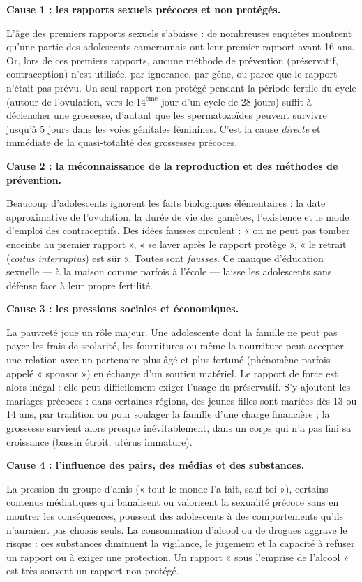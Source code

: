 \documentclass[11pt]{article}
\newcommand{\cle}[1]{{\popxbold\color{popdark}#1}}
\begin{document}
\textbf{Cause 1 : les rapports sexuels précoces et non protégés.}\par
L'âge des premiers rapports sexuels s'abaisse : de nombreuses enquêtes montrent qu'une partie des adolescents camerounais ont leur premier rapport avant 16 ans. Or, lors de ces premiers rapports, aucune méthode de prévention (préservatif, contraception) n'est utilisée, par ignorance, par gêne, ou parce que le rapport n'était pas prévu. Un seul rapport non protégé pendant la période fertile du cycle (autour de l'ovulation, vers le $14^{\text{ème}}$ jour d'un cycle de 28 jours) suffit à déclencher une grossesse, d'autant que les spermatozoïdes peuvent survivre jusqu'à 5 jours dans les voies génitales féminines. C'est la cause \emph{directe} et immédiate de la quasi-totalité des grossesses précoces.

\textbf{Cause 2 : la méconnaissance de la reproduction et des méthodes de prévention.}\par
Beaucoup d'adolescents ignorent les faits biologiques élémentaires : la date approximative de l'ovulation, la durée de vie des gamètes, l'existence et le mode d'emploi des contraceptifs. Des idées fausses circulent : « on ne peut pas tomber enceinte au premier rapport », « se laver après le rapport protège », « le retrait (\emph{coitus interruptus}) est sûr ». Toutes sont \emph{fausses}. Ce manque d'éducation sexuelle — à la maison comme parfois à l'école — laisse les adolescents sans défense face à leur propre fertilité.

\textbf{Cause 3 : les pressions sociales et économiques.}\par
La pauvreté joue un rôle majeur. Une adolescente dont la famille ne peut pas payer les frais de scolarité, les fournitures ou même la nourriture peut accepter une relation avec un partenaire plus âgé et plus fortuné (phénomène parfois appelé « \cle{sponsor} ») en échange d'un soutien matériel. Le rapport de force est alors inégal : elle peut difficilement exiger l'usage du préservatif. S'y ajoutent les \cle{mariages précoces} : dans certaines régions, des jeunes filles sont mariées dès 13 ou 14 ans, par tradition ou pour soulager la famille d'une charge financière ; la grossesse survient alors presque inévitablement, dans un corps qui n'a pas fini sa croissance (bassin étroit, utérus immature).

\textbf{Cause 4 : l'influence des pairs, des médias et des substances.}\par
La pression du groupe d'amis (« tout le monde l'a fait, sauf toi »), certains contenus médiatiques qui banalisent ou valorisent la sexualité précoce sans en montrer les conséquences, poussent des adolescents à des comportements qu'ils n'auraient pas choisis seuls. La consommation d'\cle{alcool} ou de drogues aggrave le risque : ces substances diminuent la vigilance, le jugement et la capacité à refuser un rapport ou à exiger une protection. Un rapport « sous l'emprise de l'alcool » est très souvent un rapport non protégé.
\end{document}
